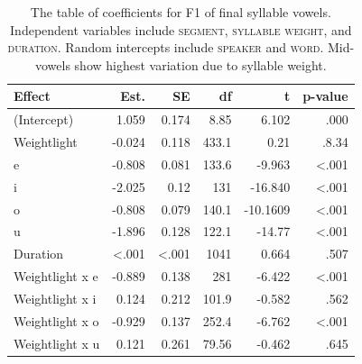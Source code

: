 \documentclass[12pt]{ouparticle}
\begin{document}
\begin{table}[h!]
\centering
\caption{The table of coefficients for F1 of final syllable vowels. Independent variables include \textsc{segment}, \textsc{syllable weight}, and \textsc{duration}. Random intercepts include \textsc{speaker} and \textsc{word}. Mid-vowels show highest variation due to syllable weight.}
\label{tab:Syll2f1_SegWeight}
\begin{tabular}{l | r r r r r}
Effect & Est. & SE & df & t & p-value\\
\hline
(Intercept) &    1.059   &  0.174  & 8.85  &  6.102 & .000\\
Weightlight  &   -0.024  &  0.118  & 433.1  &  0.21 &  .8.34 \\ 
e       &      -0.808     &  0.081  & 133.6 & -9.963 & <.001\\
i       &      -2.025    &  0.12   & 131 & -16.840 & <.001\\
o       &     -0.808     &  0.079  & 140.1 & -10.1609 & <.001\\
u       &      -1.896    &  0.128  & 122.1  & -14.77 & <.001\\
Duration &     <.001        &  <.001  & 1041  & 0.664    & .507\\
Weightlight x e & -0.889  &  0.138  & 281 & -6.422 & <.001\\
Weightlight x i & 0.124   &  0.212  & 101.9 & -0.582  & .562    \\
Weightlight x o & -0.929  &  0.137  & 252.4   & -6.762 & <.001\\
Weightlight x u & 0.121   &  0.261  & 79.56  & -0.462  & .645 \\

\end{tabular}
\end{table}
\end{document}
